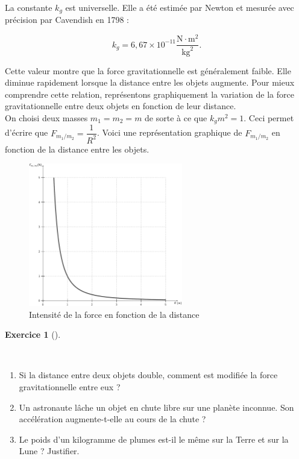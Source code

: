 \documentclass[
  letterpaper,
  DIV=11,
  numbers=noendperiod]{scrartcl}
\providecommand{\tightlist}{%
  \setlength{\itemsep}{0pt}\setlength{\parskip}{0pt}}\usepackage{longtable,booktabs,array}
\theoremstyle{definition}
\newtheorem{exercise}{Exercice}[section]
\theoremstyle{definition}
\theoremstyle{definition}
\theoremstyle{remark}
\begin{document}
La constante \(k_g\) est universelle. Elle a été estimée par Newton et
mesurée avec précision par Cavendish en 1798 :

\[
k_g = 6,67 \times 10^{-11} \dfrac{\text{N} \cdot \text{m}^2}{\text{kg}^2}.
\]

Cette valeur montre que la force gravitationnelle est généralement
faible. Elle diminue rapidement lorsque la distance entre les objets
augmente. Pour mieux comprendre cette relation, représentons
graphiquement la variation de la force gravitationnelle entre deux
objets en fonction de leur distance.\\
On choisi deux masses \(m_1=m_2=m\) de sorte à ce que \(k_gm^2=1\). Ceci
permet d'écrire que \(F_{m_1/m_2}=\dfrac{1}{R^2}\). Voici une
représentation graphique de \(F_{m_1/m_2}\) en fonction de la distance
entre les objets.

\begin{figure}[H]

{\centering \includegraphics[width=0.6\textwidth,height=\textheight]{figures/grav/fig02.pdf}

}

\caption{Intensité de la force en fonction de la distance}

\end{figure}%

\begin{exercise}[]\protect\hypertarget{exr-refl}{}\label{exr-refl}

~

\begin{enumerate}
\def\labelenumi{\arabic{enumi}.}
\tightlist
\item
  Si la distance entre deux objets double, comment est modifiée la force
  gravitationnelle entre eux ?
\item
  Un astronaute lâche un objet en chute libre sur une planète inconnue.
  Son accélération augmente-t-elle au cours de la chute ?
\item
  Le poids d'un kilogramme de plumes est-il le même sur la Terre et sur
  la Lune ? Justifier.
\end{enumerate}

\end{exercise}
\end{document}
